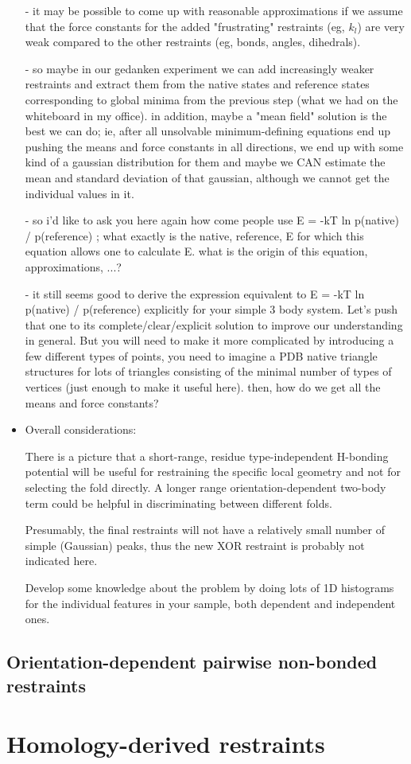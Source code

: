 \begin{itemize}
    - it may be possible to come up with reasonable approximations if we assume that the force constants for the added "frustrating" restraints (eg, $k_l$) are very weak compared to the other restraints (eg, bonds, angles, dihedrals). 

    - so maybe in our gedanken experiment we can add increasingly weaker restraints and extract them from the native states and reference states corresponding to global minima from the previous step (what we had on the whiteboard in my office). in addition, maybe a "mean field" solution is the best we can do; ie, after all unsolvable minimum-defining equations end up pushing the means and force constants in all directions, we end up with some kind of a gaussian distribution for them and maybe we CAN estimate the mean and standard deviation of that gaussian, although we cannot get the individual values in it.

- so i'd like to ask you here again how come people use E = -kT  ln p(native) / p(reference) ; what exactly is the native, reference, E for which this equation allows one to calculate E. what is the origin of this equation, approximations, ...?

- it still seems good to derive the expression equivalent to E = -kT  ln p(native) / p(reference) explicitly for your simple 3 body system. Let's push that one to its complete/clear/explicit solution to improve our understanding in general. But you will need to make it more complicated by introducing a few different types of points, you need to imagine a PDB native triangle structures for lots of triangles consisting of the minimal number of types of vertices (just enough to make it useful here). then, how do we get all the means and force constants?

\item Overall considerations:

There is a picture that a short-range, residue type-independent H-bonding potential 
will be useful for restraining the specific local geometry and not for selecting
the fold directly. A longer range orientation-dependent two-body term could be 
helpful in discriminating between different folds.

Presumably, the final restraints will not have a relatively small number of 
simple (Gaussian) peaks, thus the new XOR restraint is probably not indicated here.

Develop some knowledge about the problem by doing lots of 1D histograms for the 
individual features in your sample, both dependent and independent ones.
\end{itemize}

\subsection{Orientation-dependent pairwise non-bonded restraints}

\section{Homology-derived restraints}
